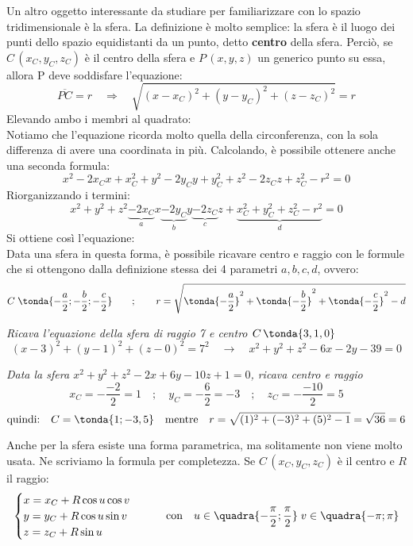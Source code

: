 Un altro oggetto interessante da studiare per familiarizzare con lo spazio tridimensionale è la sfera. La definizione è molto semplice: la sfera è il luogo dei punti dello spazio equidistanti da un punto, detto \textbf{centro} della sfera. Perciò, se $C\,(x_C,y_C,z_C)$ è il centro della sfera e $P\,(x,y,z)$ un generico punto su essa, allora P deve soddisfare l'equazione:
\[\overline{PC}=r \quad \Rightarrow \quad \sqrt{(x-x_C)^2+(y-y_C)^2+(z-z_C)^2} = r\]
Elevando ambo i membri al quadrato: \quad {}\\[8pt]
Notiamo che l'equazione ricorda molto quella della circonferenza, con la sola differenza di avere una coordinata in più. Calcolando, è possibile ottenere anche una seconda formula:
\[x^2-2x_C x +x_C^2 +y^2-2y_C y +y_C^2+z^2-2z_C z +z_C^2-r^2=0\]
Riorganizzando i termini:
\[x^2+y^2+z^2\underbrace{-2x_C}_a x\underbrace{-2y_C}_b y\underbrace{-2z_C}_c z+\underbrace{x_C^2+y_C^2+z_C^2-r^2}_d=0\]
Si ottiene così l'equazione: \quad {}\\[8pt]
Data una sfera in questa forma, è possibile ricavare centro e raggio con le formule che si ottengono dalla definizione stessa dei 4 parametri $a,b,c,d$, ovvero:
\[C\; \tonda{-\frac{a}{2};-\frac{b}{2}; -\frac{c}{2}} \qquad ;\qquad r = \sqrt{\tonda{-\frac{a}{2}}^2+\tonda{-\frac{b}{2}}^2+\tonda{-\frac{c}{2}}^2-d}\]
\begin{esempio}
 \emph{Ricava l'equazione della sfera di raggio 7 e centro $C\, \tonda{3,1,0}$}
 \[(x-3)^2+(y-1)^2+(z-0)^2=7^2 \quad \rightarrow \quad x^2+y^2+z^2-6x-2y-39=0\]
\end{esempio}
\begin{esempio}
 \emph{Data la sfera $x^2+y^2+z^2-2x+6y-10z+1=0$, ricava centro e raggio}
 \[x_C = -\frac{-2}{2}=1 \quad;\quad y_C = -\frac{6}{2}=-3 \quad;\quad z_C = -\frac{-10}{2}=5\]
 \[\text{quindi:}\quad C = \tonda{1;-3,5} \quad \text{mentre}\quad r = \sqrt{(1)^2+(-3)^2+(5)^2-1} = \sqrt{36} = 6\]
\end{esempio}

\begin{osservazione}
 Anche per la sfera esiste una forma parametrica, ma solitamente non viene molto usata. Ne scriviamo la formula per completezza. Se $C\,(x_C,y_C,z_C)$ è il centro e $R$ il raggio:
\[\begin{cases}
   x = x_C+R \cos u \cos v \\
   y = y_C+R \cos u \sin v \\
   z = z_C+R \sin u
  \end{cases} \qquad \text{con} \quad u \in \quadra{-\frac{\pi}{2};\frac{\pi}{2}} \; v \in 
\quadra{-\pi;\pi} \]
\end{osservazione}



